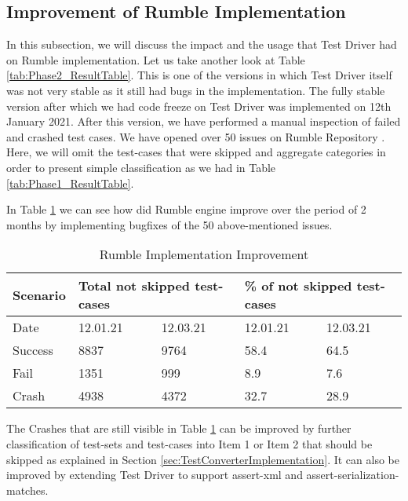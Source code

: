 \subsection{Improvement of Rumble Implementation}
In this subsection, we will discuss the impact and the usage that Test Driver had on Rumble implementation. Let us take another look at Table \ref{tab:Phase2_ResultTable}. This is one of the versions in which Test Driver itself was not very stable as it still had bugs in the implementation. The fully stable version after which we had code freeze on Test Driver was implemented on 12th January 2021. After this version, we have performed a manual inspection of failed and crashed test cases. We have opened over 50 issues on Rumble Repository \cite{RumbleRepository}. Here, we will omit the test-cases that were skipped and aggregate categories in order to present simple classification as we had in Table \ref{tab:Phase1_ResultTable}.

In Table \ref{tab:bugsimprovement} we can see how did Rumble engine improve over the period of 2 months by implementing bugfixes of the 50 above-mentioned issues.
 
\begin{table}[h!]
	\centering
	\begin{tabular}{|l|l|l|l|l|}
		\hline
		Scenario & \multicolumn{2}{l|}{Total not skipped test-cases} & \multicolumn{2}{l|}{\% of not skipped test-cases} \\ \hline
		Date     & 12.01.21                & 12.03.21                & 12.01.21                & 12.03.21                \\ \hline
		Success  & 8837                    & 9764                    & 58.4                    & 64.5                    \\ \hline
		Fail     & 1351                    & 999                     & 8.9                     & 7.6                     \\ \hline
		Crash    & 4938                    & 4372                    & 32.7                    & 28.9                    \\ \hline
	\end{tabular}
	\caption{Rumble Implementation Improvement}
	\label{tab:bugsimprovement}
\end{table}

The Crashes that are still visible in Table \ref{tab:bugsimprovement} can be improved by further classification of test-sets and test-cases into Item 1 or Item 2 that should be skipped as explained in Section \ref{sec:TestConverterImplementation}. It can also be improved by extending Test Driver to support assert-xml and assert-serialization-matches.

